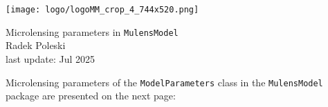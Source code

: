 \documentclass[12pt]{article}
\newcommand\MM{{\tt MulensModel}}
\begin{document}

\begin{center}
\texttt{[image: logo/logoMM\_crop\_4\_744x520.png]}
\end{center}

\vspace*{3cm}

\begin{center}
{\LARGE Microlensing parameters in \MM}\\
\bigskip
Radek Poleski\\
last update: Jul 2025
\end{center}

\bigskip
Microlensing parameters of the {\tt ModelParameters} class in the \MM\, package are presented on the next page:
\end{document}
